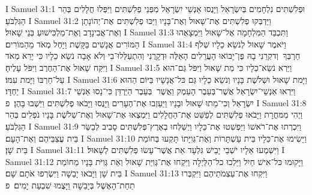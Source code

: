 I Samuel 31:1	וּפְלִשְׁתִּים נִלְחָמִים בְּיִשְׂרָאֵל וַיָּנֻסוּ אַנְשֵׁי יִשְׂרָאֵל מִפְּנֵי פְלִשְׁתִּים וַיִּפְּלוּ חֲלָלִים בְּהַר הַגִּלְבֹּעַ׃
I Samuel 31:2	וַיַּדְבְּקוּ פְלִשְׁתִּים אֶת־שָׁאוּל וְאֶת־בָּנָיו וַיַּכּוּ פְלִשְׁתִּים אֶת־יְהוֹנָתָן וְאֶת־אֲבִינָדָב וְאֶת־מַלְכִּישׁוּעַ בְּנֵי שָׁאוּל׃
I Samuel 31:3	וַתִּכְבַּד הַמִּלְחָמָה אֶל־שָׁאוּל וַיִּמְצָאֻהוּ הַמּוֹרִים אֲנָשִׁים בַּקָּשֶׁת וַיָּחֶל מְאֹד מֵהַמּוֹרִים׃
I Samuel 31:4	וַיֹּאמֶר שָׁאוּל לְנֹשֵׂא כֵלָיו שְׁלֹף חַרְבְּךָ  וְדקְרֵנִי בָהּ פֶּן־יָבוֹאוּ הָעֲרֵלִים הָאֵלֶּה וּדְקָרֻנִי וְהִתְעַלְּלוּ־בִי וְלֹא אָבָה נֹשֵׂא כֵלָיו כִּי יָרֵא מְאֹד וַיִּקַּח שָׁאוּל אֶת־הַחֶרֶב וַיִּפֹּל עָלֶיהָ׃
I Samuel 31:5	וַיַּרְא נֹשֵׂא־כֵלָיו כִּי מֵת שָׁאוּל וַיִּפֹּל גַּם־הוּא עַל־חַרְבּוֹ וַיָּמת עִמּוֹ׃
I Samuel 31:6	וַיָּמת שָׁאוּל וּשְׁלֹשֶׁת בָּנָיו וְנֹשֵׂא כֵלָיו גַּם כּל־אֲנָשָׁיו בַּיּוֹם הַהוּא יַחְדָּו׃
I Samuel 31:7	וַיִּרְאוּ אַנְשֵׁי־יִשְׂרָאֵל אֲשֶׁר־בְּעֵבֶר הָעֵמֶק וַאֲשֶׁר  בְּעֵבֶר הַיַּרְדֵּן כִּי־נָסוּ אַנְשֵׁי יִשְׂרָאֵל וְכִי־מֵתוּ שָׁאוּל וּבָנָיו וַיַּעַזְבוּ אֶת־הֶעָרִים וַיָּנֻסוּ וַיָּבֹאוּ פְלִשְׁתִּים וַיֵּשְׁבוּ בָּהֶן׃ {פ}
I Samuel 31:8	וַיְהִי מִמּחֳרָת וַיָּבֹאוּ פְלִשְׁתִּים לְפַשֵּׁט אֶת־הַחֲלָלִים וַיִּמְצְאוּ אֶת־שָׁאוּל וְאֶת־שְׁלֹשֶׁת בָּנָיו נֹפְלִים בְּהַר הַגִּלְבֹּעַ׃
I Samuel 31:9	וַיִּכְרְתוּ אֶת־רֹאשׁוֹ וַיַּפְשִׁטוּ אֶת־כֵּלָיו וַיְשַׁלְּחוּ בְאֶרֶץ־פְּלִשְׁתִּים סָבִיב לְבַשֵּׂר בֵּית עֲצַבֵּיהֶם וְאֶת־הָעָם׃
I Samuel 31:10	וַיָּשִׂימוּ אֶת־כֵּלָיו בֵּית עַשְׁתָּרוֹת וְאֶת־גְּוִיָּתוֹ תָּקְעוּ בְּחוֹמַת בֵּית שָׁן׃
I Samuel 31:11	וַיִּשְׁמְעוּ אֵלָיו יֹשְׁבֵי יָבֵישׁ גִּלְעָד אֵת אֲשֶׁר־עָשׂוּ פְלִשְׁתִּים לְשָׁאוּל׃
I Samuel 31:12	וַיָּקוּמוּ כּל־אִישׁ חַיִל וַיֵּלְכוּ כל־הַלַּיְלָה וַיִּקְחוּ אֶת־גְּוִיַּת שָׁאוּל וְאֵת גְּוִיֹּת בָּנָיו מֵחוֹמַת בֵּית שָׁן וַיָּבֹאוּ יָבֵשָׁה וַיִּשְׂרְפוּ אֹתָם שָׁם׃
I Samuel 31:13	וַיִּקְחוּ אֶת־עַצְמֹתֵיהֶם וַיִּקְבְּרוּ תַחַת־הָאֶשֶׁל בְּיָבֵשָׁה וַיָּצֻמוּ שִׁבְעַת יָמִים׃ {פ}
